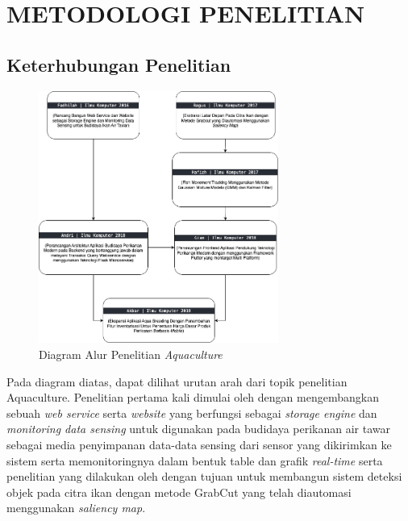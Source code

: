 
\chapter{METODOLOGI PENELITIAN}

\section{Keterhubungan Penelitian}

\begin{figure}[H]
	\centering
	\includegraphics[width=0.7\textwidth]{gambar/research_tree.png}
	\caption{Diagram Alur Penelitian \textit{Aquaculture}}
\end{figure}

Pada diagram diatas, dapat dilihat urutan arah dari topik penelitian Aquaculture. Penelitian pertama kali dimulai oleh \citep{fadhil2021} dengan mengembangkan sebuah \textit{web service} serta \textit{website} yang berfungsi sebagai \textit{storage engine} dan \textit{monitoring data sensing} untuk digunakan pada budidaya perikanan air tawar sebagai media penyimpanan data-data sensing dari sensor yang dikirimkan ke sistem serta memonitoringnya dalam bentuk table dan grafik \textit{real-time} serta penelitian yang dilakukan oleh \citep{bagus2022} dengan tujuan untuk membangun sistem deteksi objek pada citra ikan dengan metode GrabCut yang telah diautomasi menggunakan \textit{saliency map}.

